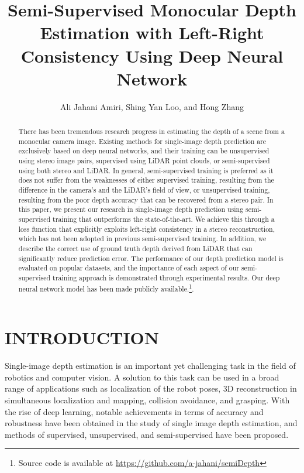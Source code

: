\documentclass[letterpaper, 10 pt, conference]{ieeeconf}
\title{\LARGE \bf
Semi-Supervised Monocular Depth Estimation with Left-Right Consistency Using Deep Neural Network
}
\author{Ali Jahani Amiri, Shing Yan Loo, and Hong Zhang}
\begin{document}
\maketitle
\thispagestyle{empty}
\pagestyle{empty}



\begin{abstract}
There has been tremendous research progress in estimating the depth of a scene from a monocular camera image.  Existing methods for single-image depth prediction are exclusively based on deep neural networks, and their training can be unsupervised using stereo image pairs, supervised using LiDAR point clouds, or semi-supervised using both stereo and LiDAR. In general, semi-supervised training is preferred as it does not suffer from the weaknesses of either supervised training, resulting from the difference in the camera’s and the LiDAR’s field of view, or unsupervised training, resulting from the poor depth accuracy that can be recovered from a stereo pair.  In this paper, we present our research in single-image depth prediction using semi-supervised training that outperforms the state-of-the-art.  We achieve this through a loss function that explicitly exploits left-right consistency in a stereo reconstruction, which has not been adopted in previous semi-supervised training.  In addition, we describe the correct use of ground truth depth derived from LiDAR that can significantly reduce prediction error.  The performance of our depth prediction model is evaluated on popular datasets, and the importance of each aspect of our semi-supervised training approach is demonstrated through experimental results. Our deep neural network model has been made publicly available.\footnote{Source code is available at {\color{magenta} \hyperref[https://github.com/a-jahani/semiDepth]{https://github.com/a-jahani/semiDepth}}}.


\end{abstract}


\section{INTRODUCTION}


Single-image depth estimation is an important yet challenging task in the field of robotics and computer vision. A solution to this task can be used in a broad range of applications such as localization of the robot poses\cite{loo2018cnn, Yang_2018_ECCV}, 3D reconstruction in simultaneous localization and mapping\cite{tateno2017cnn}, collision avoidance\cite{chakravarty2017cnn}, and grasping\cite{rao2010grasping}. With the rise of deep learning, notable achievements in terms of accuracy and robustness have been obtained in the study of single image depth estimation, and methods of supervised,  unsupervised,  and semi-supervised have been proposed. 
\end{document}
